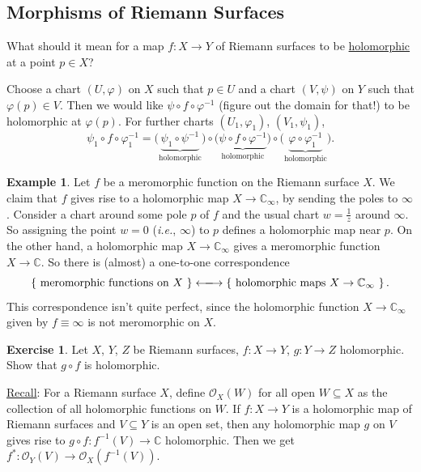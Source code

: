 \documentclass[12pt]{article}
\newcommand{\cx}{\mathbb{C}}
\newcommand{\ita}[1]{\textit{#1}}
\newcommand\inv[1]{#1^{-1}}
\newcommand\setb[1]{\left \{ #1 \right \}}
\theoremstyle{definition}
\newtheorem{example}[theorem]{Example}
\newtheorem{exercise}{Exercise}
\theoremstyle{remark}
\begin{document}
\subsection{Morphisms of Riemann Surfaces}
What should it mean for a map $f : X \to Y$ of Riemann surfaces to be \underline{holomorphic} at a point $p \in X$?

Choose a chart $(U , \varphi)$ on $X$ such that $p \in U$ and a chart $(V , \psi)$ on $Y$ such that $\varphi(p) \in V$. Then we would like $\psi \circ f \circ \inv{\varphi}$ (figure out the domain for that!) to be holomorphic at $\varphi(p)$. For further charts $(U_1 , \varphi_1)$, $(V_1 , \psi_1)$, \begin{equation}
    \psi_1 \circ f \circ \inv{\varphi_1} = \big( \underbrace{\psi_1 \circ \inv{\psi}}_{\text{holomorphic}} \big) \circ \big( \underbrace{\psi \circ f \circ \inv{\varphi}}_{\text{holomorphic}} \big) \circ \big( \underbrace{\varphi \circ \inv{\varphi_1}}_{\text{holomorphic}} \big).
\end{equation}
\begin{example}
    Let $f$ be a meromorphic function on the Riemann surface $X$. We claim that $f$ gives rise to a holomorphic map $X \to \cx_{\infty}$, by sending the poles to $\infty$. 
    Consider a chart around some pole $p$ of $f$ and the usual chart $w = \frac{1}{z}$ around $\infty$. So assigning the point $w = 0$ (\ita{i.e.}, $\infty$) to $p$ defines a holomorphic map near $p$.
    On the other hand, a holomorphic map $X \to \cx_{\infty}$ gives a meromorphic function $X \to \cx$. So there is (almost) a one-to-one correspondence
    \begin{equation}
        \setb{ \text{ meromorphic functions on $X$ } } \xlongleftrightarrow{} \setb{ \text{ holomorphic maps $X \to \cx_{\infty}$ } }.
    \end{equation}
    This correspondence isn't quite perfect, since the holomorphic function $X \to \cx_{\infty}$ given by $f \equiv \infty$ is not meromorphic on $X$.
\end{example}
\begin{exercise}
    Let $X$, $Y$, $Z$ be Riemann surfaces, $f : X \to Y$, $g: Y \to Z$ holomorphic. Show that $g \circ f$ is holomorphic.
\end{exercise}
\noindent \underline{Recall}: For a Riemann surface $X$, define $\mathcal{O}_X(W)$ for all open $W \subseteq X$ as the collection of all holomorphic functions on $W$. If $f : X \to Y$ is a holomorphic map of Riemann surfaces and $V \subseteq Y$ is an open set, then any holomorphic map $g$ on $V$ gives rise to $g \circ f : \inv{f}(V) \to \cx$ holomorphic. Then we get $f^* : \mathcal{O}_Y(V) \to \mathcal{O}_X \left( \inv{f}(V) \right)$.
\end{document}
